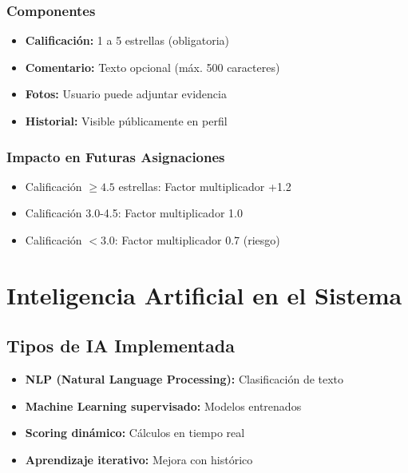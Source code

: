 \documentclass[12pt,a4paper,spanish]{article}
\begin{document}
\subsubsection{Componentes}

\begin{itemize}
    \item \textbf{Calificación:} 1 a 5 estrellas (obligatoria)
    \item \textbf{Comentario:} Texto opcional (máx. 500 caracteres)
    \item \textbf{Fotos:} Usuario puede adjuntar evidencia
    \item \textbf{Historial:} Visible públicamente en perfil
\end{itemize}

\subsubsection{Impacto en Futuras Asignaciones}

\begin{itemize}
    \item Calificación $\geq 4.5$ estrellas: Factor multiplicador +1.2
    \item Calificación 3.0-4.5: Factor multiplicador 1.0
    \item Calificación $< 3.0$: Factor multiplicador 0.7 (riesgo)
\end{itemize}

\newpage

\section{Inteligencia Artificial en el Sistema}

\subsection{Tipos de IA Implementada}

\begin{itemize}
    \item \textbf{NLP (Natural Language Processing):} Clasificación de texto
    \item \textbf{Machine Learning supervisado:} Modelos entrenados
    \item \textbf{Scoring dinámico:} Cálculos en tiempo real
    \item \textbf{Aprendizaje iterativo:} Mejora con histórico
\end{itemize}
\end{document}
